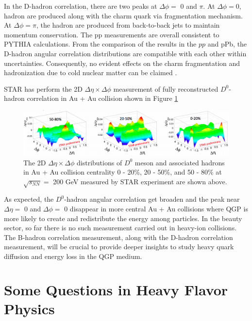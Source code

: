 In the D-hadron correlation, there are two peaks at $\Delta \phi =$ 0 and $\pi$. At $\Delta \phi = $0, hadron are produced along with the charm quark via fragmentation mechanism. At $\Delta \phi = \pi$, the hadron are produced from back-to-back jets to maintain momentum conservation. The pp measurements are overall consistent to PYTHIA calculations. From the comparison of the results in the $pp$ and pPb, the D-hadron angular correlation distributions are compatible with each other within uncertainties. Consequently, no evident effects on the charm fragmentation and hadronization due to cold nuclear matter can be claimed  \cite{DHadronRef}. 

STAR has perform the 2D $\Delta \eta \times \Delta \phi$ measurement of fully reconstructed $D^0$-hadron correlation in Au + Au collision \cite{DHadronSTAR} shown in Figure \ref{STARDHadron}

\begin{figure}[hbtp]
\begin{center}
\includegraphics[width=1.05\textwidth]{Figures/Chapter2/STARDHadron.png}
\caption{The 2D $\Delta \eta \times \Delta \phi$ distributions of $D^0$ meson and associated hadrons in Au + Au collision centrality 0 - 20\%, 20 - 50\%, and 50 - 80\% at $\sqrt{s_{NN}} = $ 200 GeV measured by STAR experiment are shown above.}
\label{STARDHadron}
\end{center}
\end{figure} 

As expected, the $D^0$-hadron angular correlation get broaden and the peak near $\Delta \eta = $ 0 and $\Delta \phi = $ 0 disappear in more central Au + Au collisions where QGP is more likely to create and redistribute the energy among particles. In the beauty sector, so far there is no such measurement carried out in heavy-ion collisions. The B-hadron correlation measurement, along with the D-hadron correlation measurement, will be crucial to provide deeper insights to study heavy quark diffusion and energy loss in the QGP medium. 

\section{Some Questions in Heavy Flavor Physics}

